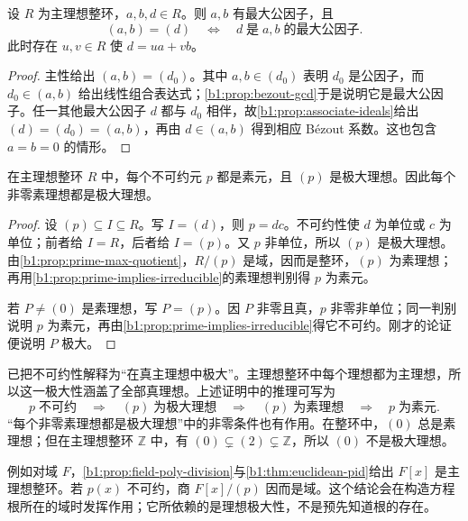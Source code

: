 \begin{proposition}\label{b1:prop:pid-bezout}
	设 \(R\) 为主理想整环，\(a,b,d\in R\)。则 \(a,b\) 有最大公因子，且
	\[
		(a,b)=(d)\quad\Longleftrightarrow\quad d\;\text{是}\;a,b\;\text{的最大公因子}.
	\]
	此时存在 \(u,v\in R\) 使 \(d=ua+vb\)。
\end{proposition}
\begin{proof}
	主性给出 \((a,b)=(d_0)\)。其中 \(a,b\in(d_0)\) 表明 \(d_0\) 是公因子，而 \(d_0\in(a,b)\) 给出线性组合表达式；\cref{b1:prop:bezout-gcd}于是说明它是最大公因子。任一其他最大公因子 \(d\) 都与 \(d_0\) 相伴，故\cref{b1:prop:associate-ideals}给出 \((d)=(d_0)=(a,b)\)，再由 \(d\in(a,b)\) 得到相应 Bézout 系数。这也包含 \(a=b=0\) 的情形。
\end{proof}

\begin{proposition}\label{b1:prop:pid-irreducible-prime}
	在主理想整环 \(R\) 中，每个不可约元 \(p\) 都是素元，且 \((p)\) 是极大理想。因此每个非零素理想都是极大理想。
\end{proposition}
\begin{proof}
	设 \((p)\subseteq I\subseteq R\)。写 \(I=(d)\)，则 \(p=dc\)。不可约性使 \(d\) 为单位或 \(c\) 为单位；前者给 \(I=R\)，后者给 \(I=(p)\)。又 \(p\) 非单位，所以 \((p)\) 是极大理想。由\cref{b1:prop:prime-max-quotient}，\(R/(p)\) 是域，因而是整环，\((p)\) 为素理想；再用\cref{b1:prop:prime-implies-irreducible}的素理想判别得 \(p\) 为素元。

	若 \(P\ne(0)\) 是素理想，写 \(P=(p)\)。因 \(P\) 非零且真，\(p\) 非零非单位；同一判别说明 \(p\) 为素元，再由\cref{b1:prop:prime-implies-irreducible}得它不可约。刚才的论证便说明 \(P\) 极大。
\end{proof}

已把不可约性解释为“在真主理想中极大”。主理想整环中每个理想都为主理想，所以这一极大性涵盖了全部真理想。上述证明中的推理可写为
\[
	p\;\text{不可约} \quad\Longrightarrow\quad (p)\;\text{为极大理想} \quad\Longrightarrow\quad (p)\;\text{为素理想} \quad\Longrightarrow\quad p\;\text{为素元}.
\]
“每个非零素理想都是极大理想”中的非零条件也有作用。在整环中，\((0)\) 总是素理想；但在主理想整环 \(\mathbb Z\) 中，有 \((0)\subsetneq(2)\subsetneq\mathbb Z\)，所以 \((0)\) 不是极大理想。

\ProseParagraphBreak
例如对域 \(F\)，\cref{b1:prop:field-poly-division}与\cref{b1:thm:euclidean-pid}给出 \(F[x]\) 是主理想整环。若 \(p(x)\) 不可约，商 \(F[x]/(p)\) 因而是域。这个结论会在构造方程根所在的域时发挥作用；它所依赖的是理想极大性，不是预先知道根的存在。


